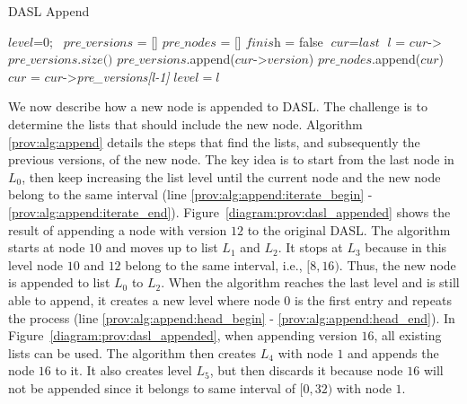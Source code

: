 \begin{algorithm}[t]
  \caption{DASL Append}
  \label{prov:alg:append}
  $\textit{level}$=0;\    
  $\textit{pre\_versions}$ = []\;
  $\textit{pre\_nodes}$ = []\;
  $\textit{finish}$ = false \;
  $\textit{cur} = \textit{last}$ \;
   {
    $l$ = $\textit{cur}$->$\textit{pre\_versions.size()}$ \;
     {
       { \label{prov:alg:append:iterate_begin}
         {
          $\textit{pre\_versions}$.append($\textit{cur}$->$\textit{version}$)\;
          $\textit{pre\_nodes}$.append($\textit{cur}$)\;
        } 
      }
       {
        $\textit{cur}$ = $\textit{cur}$->\textit{pre\_versions[l-1]}\;
        $\textit{level}=l$
      } \label{prov:alg:append:iterate_end}
    } 
  }

\end{algorithm}

We now describe how a new node is appended to DASL. The challenge is to determine the lists that should include the
new node. Algorithm \ref{prov:alg:append} details the steps that find the lists, and subsequently the previous
versions, of the new node. The key idea is to start from the last node in $L_0$, then keep increasing the list
level until the current node and the new node belong to the same interval (line
\ref{prov:alg:append:iterate_begin} - \ref{prov:alg:append:iterate_end}). Figure~\ref{diagram:prov:dasl_appended} shows the result of appending a node with version $12$ to the original DASL. The algorithm starts at node $10$ and moves up to list $L_1$ and $L_2$. It stops at $L_3$ because in this level node $10$ and $12$ belong to the same
interval, i.e., $[8,16)$. Thus, the new node is appended to list $L_0$ to $L_2$. When the algorithm reaches
the last level and is still able to append, it creates a new level where node $0$ is the first entry and
repeats the process (line \ref{prov:alg:append:head_begin} -
\ref{prov:alg:append:head_end}). In Figure~\ref{diagram:prov:dasl_appended}, when appending version $16$, all existing lists can be used. The algorithm then creates $L_4$ with node $1$ and appends the node $16$ to it. It also creates
level $L_5$, but then discards it because node $16$ will not be appended since it belongs to same
interval of $[0,32)$ with node $1$. 

